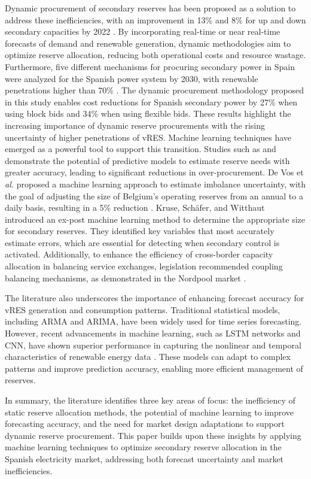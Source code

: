 Dynamic procurement of secondary reserves has been proposed as a solution to address these inefficiencies, with an improvement in 13\% and 8\% for up and down secondary capacities by 2022 \cite{Algarvio2024}. By incorporating real-time or near real-time forecasts of demand and renewable generation, dynamic methodologies aim to optimize reserve allocation, reducing both operational costs and resource wastage.
%
Furthermore, five different mechanisms for procuring secondary power in Spain were analyzed for the Spanish power system by 2030, with renewable penetrations higher than 70\% \cite{Algarvio:24}. The dynamic procurement methodology proposed in this study enables cost reductions for Spanish secondary power by 27\% when using block bids and 34\% when using flexible bids. These results highlight the increasing importance of dynamic reserve procurements with the rising uncertainty of higher penetrations of \gls{vRES}.  
%
Machine learning techniques have emerged as a powerful tool to support this transition. Studies such as \cite{DeVos2019} and \cite{Kruse2022} demonstrate the potential of predictive models to estimate reserve needs with greater accuracy, leading to significant reductions in over-procurement. 
De Vos et \textit{al.}\cite{DeVos2019} proposed a machine learning approach to estimate imbalance uncertainty, with the goal of adjusting the size of Belgium's operating reserves from an annual to a daily basis, resulting in a 5\% reduction \cite{DeVos2019}. Kruse, Sch\"{a}fer, and Witthaut introduced an ex-post machine learning method to determine the appropriate size for secondary reserves. They identified key variables that most accurately estimate errors, which are essential for detecting when secondary control is activated. Additionally, to enhance the efficiency of cross-border capacity allocation in balancing service exchanges, legislation recommended coupling balancing mechanisms, as demonstrated in the Nordpool market \cite{Frade:19c,Khodadadi:20}.\par
The literature also underscores the importance of enhancing forecast accuracy for \gls{vRES} generation and consumption patterns. Traditional statistical models, including ARMA and ARIMA, have been widely used for time series forecasting. However, recent advancements in machine learning, such as \gls{LSTM} networks and \gls{CNN}, have shown superior performance in capturing the nonlinear and temporal characteristics of renewable energy data \cite{Benti2023}. These models can adapt to complex patterns and improve prediction accuracy, enabling more efficient management of reserves.\par
In summary, the literature identifies three key areas of focus: the inefficiency of static reserve allocation methods, the potential of machine learning to improve forecasting accuracy, and the need for market design adaptations to support dynamic reserve procurement. This paper builds upon these insights by applying machine learning techniques to optimize secondary reserve allocation in the Spanish electricity market, addressing both forecast uncertainty and market inefficiencies.\par